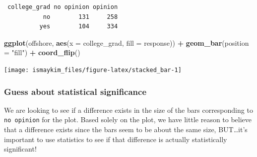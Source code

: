 \documentclass[12pt,]{krantz}
\makeatletter
\newenvironment{Shaded}{\begin{snugshade}}{\end{snugshade}}
\newcommand{\KeywordTok}[1]{\textcolor[rgb]{0.27,0.27,0.27}{\textbf{#1}}}
\newcommand{\DataTypeTok}[1]{\textcolor[rgb]{0.27,0.27,0.27}{#1}}
\newcommand{\StringTok}[1]{\textcolor[rgb]{0.5,0.5,0.5}{#1}}
\newcommand{\OperatorTok}[1]{\textcolor[rgb]{0.43,0.43,0.43}{\textbf{#1}}}
\newcommand{\NormalTok}[1]{#1}
\newenvironment{kframe}{%
\medskip{}
\setlength{\fboxsep}{.8em}
 \def\at@end@of@kframe{}%
 \ifinner\ifhmode%
  \def\at@end@of@kframe{\end{minipage}}%
  \begin{minipage}{\columnwidth}%
 \fi\fi%
 \def\FrameCommand##1{\hskip\@totalleftmargin \hskip-\fboxsep
 \colorbox{shadecolor}{##1}\hskip-\fboxsep
     \hskip-\linewidth \hskip-\@totalleftmargin \hskip\columnwidth}%
 \MakeFramed {\advance\hsize-\width
   \@totalleftmargin\z@ \linewidth\hsize
   \@setminipage}}%
 {\par\unskip\endMakeFramed%
 \at@end@of@kframe}
\renewenvironment{Shaded}{\begin{kframe}}{\end{kframe}}
\makeatother
\begin{document}
\begin{Shaded}
\end{Shaded}

\begin{verbatim}
 college_grad no opinion opinion
           no        131     258
          yes        104     334
\end{verbatim}

\begin{Shaded}
\end{Shaded}

\begin{Shaded}
\begin{Highlighting}[]
\KeywordTok{ggplot}\NormalTok{(offshore, }\KeywordTok{aes}\NormalTok{(}\DataTypeTok{x =}\NormalTok{ college_grad, }\DataTypeTok{fill =}\NormalTok{ response)) }\OperatorTok{+}
\StringTok{  }\KeywordTok{geom_bar}\NormalTok{(}\DataTypeTok{position =} \StringTok{"fill"}\NormalTok{) }\OperatorTok{+}
\StringTok{  }\KeywordTok{coord_flip}\NormalTok{()}
\end{Highlighting}
\end{Shaded}

\begin{center}\texttt{[image: ismaykim\_files/figure-latex/stacked\_bar-1]} \end{center}

\subsubsection*{Guess about statistical
significance}\label{guess-about-statistical-significance-2}

We are looking to see if a difference exists in the size of the bars
corresponding to \texttt{no\ opinion} for the plot. Based solely on the
plot, we have little reason to believe that a difference exists since
the bars seem to be about the same size, BUT\ldots{}it's important to
use statistics to see if that difference is actually statistically
significant!
\end{document}

